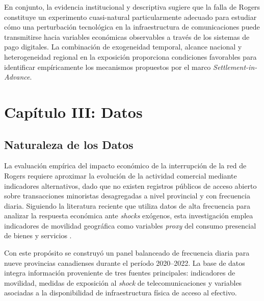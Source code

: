 En conjunto, la evidencia institucional y descriptiva sugiere que la falla de 
Rogers constituye un experimento cuasi-natural particularmente adecuado para 
estudiar c\'omo una perturbaci\'on tecnol\'ogica en la infraestructura de 
comunicaciones puede transmitirse hacia variables econ\'omicas observables a 
trav\'es de los sistemas de pago digitales. La combinaci\'on de exogeneidad 
temporal, alcance nacional y heterogeneidad regional en la exposici\'on 
proporciona condiciones favorables para identificar emp\'iricamente los 
mecanismos propuestos por el marco \textit{Settlement-in-Advance}.

\newpage
\section{Cap\'itulo III: Datos}
\subsection{Naturaleza de los Datos}

La evaluaci\'on emp\'irica del impacto econ\'omico de la interrupci\'on de la 
red de Rogers requiere aproximar la evoluci\'on de la actividad comercial 
mediante indicadores alternativos, dado que no existen registros p\'ublicos de 
acceso abierto sobre transacciones minoristas desagregadas a nivel provincial y 
con frecuencia diaria. Siguiendo la literatura reciente que utiliza datos de 
alta frecuencia para analizar la respuesta econ\'omica ante \textit{shocks} 
ex\'ogenos, esta investigaci\'on emplea indicadores de movilidad geogr\'afica 
como variables \textit{proxy} del consumo presencial de bienes y servicios 
\citep{chetty2020economic, bounie2020consumers, stephens2014hands}.

Con este prop\'osito se construy\'o un panel balanceado de frecuencia diaria 
para nueve provincias canadienses durante el per\'iodo 2020--2022. La base de 
datos integra informaci\'on proveniente de tres fuentes principales: 
indicadores de movilidad, medidas de exposici\'on al \textit{shock} de 
telecomunicaciones y variables asociadas a la disponibilidad de infraestructura 
f\'isica de acceso al efectivo.

